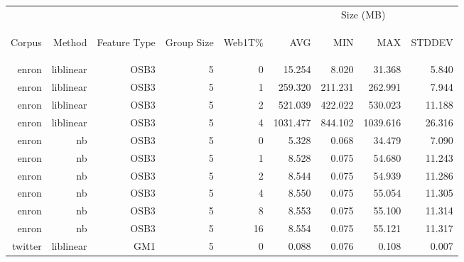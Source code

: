 	\begin{table}[htbp!]
	\begin{center}
		\begin{tabular}{ | r | r | r | r | r | r | r | r | r | }
			\hline
			 &  &  &  &  & \multicolumn{4}{|c|}{Size (MB)}\\ \cline{6-9}
			\begin{sideways}Corpus\end{sideways} & \begin{sideways}Method\end{sideways} & \begin{sideways}Feature Type\end{sideways} & \begin{sideways}Group Size\end{sideways} & \begin{sideways}Web1T\%\end{sideways} & \begin{sideways}AVG\end{sideways} & \begin{sideways}MIN\end{sideways} & \begin{sideways}MAX\end{sideways} & \begin{sideways}STDDEV\end{sideways}\\ \hline
enron & liblinear & OSB3 & 5 & 0 & 15.254 & 8.020 & 31.368 & 5.840\\ \hline 
enron & liblinear & OSB3 & 5 & 1 & 259.320 & 211.231 & 262.991 & 7.944\\ \hline 
enron & liblinear & OSB3 & 5 & 2 & 521.039 & 422.022 & 530.023 & 11.188\\ \hline 
enron & liblinear & OSB3 & 5 & 4 & 1031.477 & 844.102 & 1039.616 & 26.316\\ \hline 
enron & nb & OSB3 & 5 & 0 & 5.328 & 0.068 & 34.479 & 7.090\\ \hline 
enron & nb & OSB3 & 5 & 1 & 8.528 & 0.075 & 54.680 & 11.243\\ \hline 
enron & nb & OSB3 & 5 & 2 & 8.544 & 0.075 & 54.939 & 11.286\\ \hline 
enron & nb & OSB3 & 5 & 4 & 8.550 & 0.075 & 55.054 & 11.305\\ \hline 
enron & nb & OSB3 & 5 & 8 & 8.553 & 0.075 & 55.100 & 11.314\\ \hline 
enron & nb & OSB3 & 5 & 16 & 8.554 & 0.075 & 55.121 & 11.317\\ \hline 
twitter & liblinear & GM1 & 5 & 0 & 0.088 & 0.076 & 0.108 & 0.007\\ \hline 

\end{tabular}
\end{center}
\end{table}
